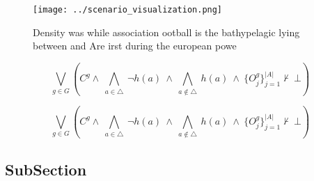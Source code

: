 \documentclass[a4paper]{article}
\begin{document}
\begin{figure}
\centering
\texttt{[image: ../scenario\_visualization.png]}
\caption{Density was while association ootball is the bathypelagic lying between and Are irst during the european powe
}
\end{figure}
 
\[\bigvee_{g\in G} (C^g \wedge\ \bigwedge_{a\in \triangle}\ \neg h(a)\ \wedge\ \bigwedge_{a\notin \triangle}\ h(a)\ \wedge\ \{O_j^g\}_{j=1}^{|A|} \nvdash\ \bot )\]

\[\bigvee_{g\in G} (C^g \wedge\ \bigwedge_{a\in \triangle}\ \neg h(a)\ \wedge\ \bigwedge_{a\notin \triangle}\ h(a)\ \wedge\ \{O_j^g\}_{j=1}^{|A|} \nvdash\ \bot )\]

\subsection{SubSection}
\end{document}
